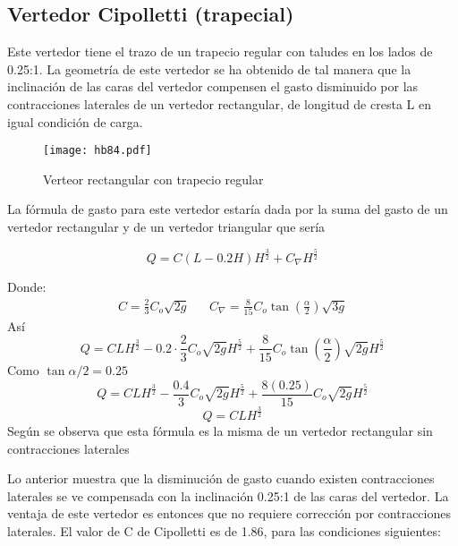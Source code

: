     \subsection{Vertedor Cipolletti (trapecial)}
    
    Este vertedor tiene el trazo de un trapecio regular con taludes en los lados de 0.25:1. La geometría de este vertedor se ha obtenido de tal manera que la inclinación de las caras del vertedor compensen el gasto disminuido por las contracciones laterales de un vertedor rectangular, de longitud de cresta L en igual condición de carga.
    
    \begin{figure}[h!]
    \centering
      \texttt{[image: hb84.pdf]}
      \caption{Verteor rectangular con trapecio regular}
      \label{hb84}
    \end{figure}
    La fórmula de gasto para este vertedor estaría dada por la suma del gasto de un vertedor rectangular y de un vertedor triangular que sería
    
    \begin{equation}
        Q= C\left(L - 0.2H\right)H^{\frac{3}{2}} + C_{\nabla}H^{\frac{5}{2}}
    \end{equation}
    
    Donde:
    \begin{align*}
        C = \frac{2}{3}C_o \sqrt{2g}&& C_{\nabla} = \frac{8}{15}C_o \tan{\left(\frac{\alpha}{2}\right)} \sqrt{3g}
    \end{align*}
    Así
    \begin{equation*}
        Q = CLH^{\frac{3}{2}} - 0.2\cdot \frac{2}{3}C_o \sqrt{2g}H^{\frac{5}{2}} + \frac{8}{15}C_o \tan{\left(\frac{\alpha}{2}\right)} \sqrt{2g}H^{\frac{5}{2}}
    \end{equation*}
    Como $\tan{\alpha/2}=0.25$
    \begin{equation*}
        Q = CLH^{\frac{3}{2}} - \frac{0.4}{3}C_o \sqrt{2g}H^{\frac{5}{2}} + \frac{8(0.25)}{15}C_o \sqrt{2g}H^{\frac{5}{2}}
    \end{equation*}
    \begin{equation}
        Q = CLH^{\frac{3}{2}}
    \end{equation}
    Según se observa que esta fórmula es la misma de un vertedor rectangular sin contracciones laterales
    
    Lo anterior muestra que la disminución de gasto cuando existen contracciones laterales se ve compensada con la inclinación 0.25:1 de las caras del vertedor. La ventaja de este vertedor es entonces que no requiere corrección por contracciones laterales. El valor de C de Cipolletti es de 1.86, para las condiciones siguientes:
    
